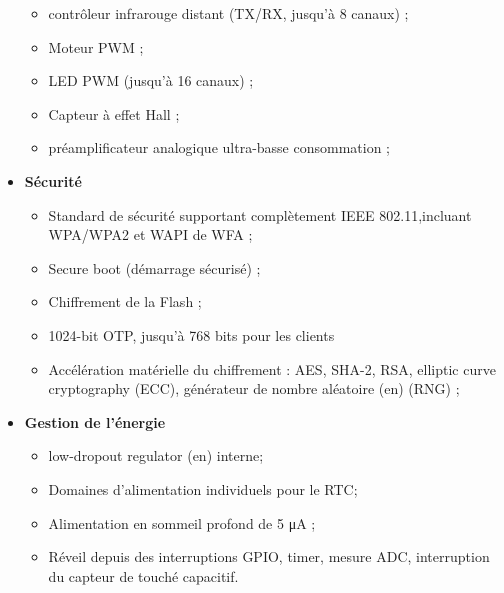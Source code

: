 \begin{itemize}
\begin{itemize}
                    \item contrôleur infrarouge distant (TX/RX, jusqu'à 8 canaux) ;
                    \item Moteur PWM ;
                    \item LED PWM (jusqu'à 16 canaux) ;
                    \item Capteur à effet Hall ;
                    \item préamplificateur analogique ultra-basse consommation ;
                \end{itemize}
            \item[\textbullet]\textbf{Sécurité}
                \begin{itemize}
                    \item Standard de sécurité supportant complètement IEEE 802.11,incluant WPA/WPA2 et WAPI de WFA ;
                    \item Secure boot (démarrage sécurisé) ;
                    \item Chiffrement de la Flash ;
                    \item 1024-bit OTP, jusqu'à 768 bits pour les clients
                    \item Accélération matérielle du chiffrement : AES, SHA-2, RSA, elliptic curve cryptography (ECC), générateur de nombre aléatoire (en) (RNG) ;
                \end{itemize}
            \item[\textbullet]\textbf{Gestion de l'énergie}
                \begin{itemize}
                    \item low-dropout regulator (en) interne;
                    \item Domaines d'alimentation individuels pour le RTC;
                    \item Alimentation en sommeil profond de 5 μA ;
                    \item Réveil depuis des interruptions GPIO, timer, mesure ADC, interruption du capteur de touché capacitif.
                \end{itemize}
        \end{itemize}
     
